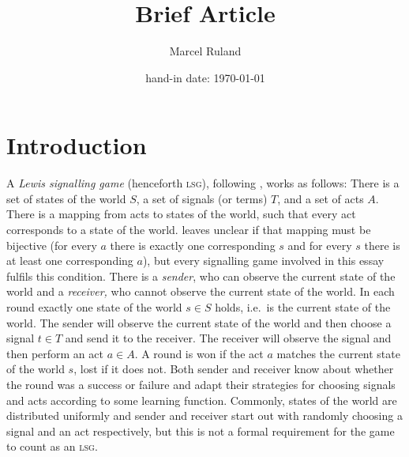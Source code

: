 \documentclass[DIV=calc,BCOR=0mm,pagesize]{scrartcl}
\title{Brief Article}
\author{Marcel Ruland}
\date{hand-in date: \today}  %
\newcommand{\lsg}{\textsc{lsg}}
\begin{document}
\maketitle
\tableofcontents

\section{Introduction}
\label{sec:int}
A \emph{Lewis signalling game} (henceforth \lsg), following \citet[p.~530ff.]{barrett_dynamic_2007}, works as follows:
There is a set of states of the world \(S\), a set of signals (or terms) \(T\), and a set of acts \(A\).
There is a mapping from acts to states of the world, such that every act corresponds to a state of the world.
\citet{barrett_dynamic_2007} leaves unclear if that mapping must be bijective (for every \(a\) there is exactly one corresponding \(s\) and for every \(s\) there is at least one corresponding \(a\)), but every signalling game involved in this essay fulfils this condition.
There is a \emph{sender}, who can observe the current state of the world and a \emph{receiver,} who cannot observe the current state of the world.
In each round exactly one state of the world \(s \in S\) holds, i.e.~is the current state of the world.
The sender will observe the current state of the world and then choose a signal \(t \in T\) and send it to the receiver.
The receiver will observe the signal and then perform an act \(a \in A\).
A round is won if the act \(a\) matches the current state of the world \(s\), lost if it does not.
Both sender and receiver know about whether the round was a success or failure and adapt their strategies for choosing signals and acts according to some learning function.
Commonly, states of the world are distributed uniformly and sender and receiver start out with randomly choosing a signal and an act respectively, but this is not a formal requirement for the game to count as an \lsg.
\end{document}
